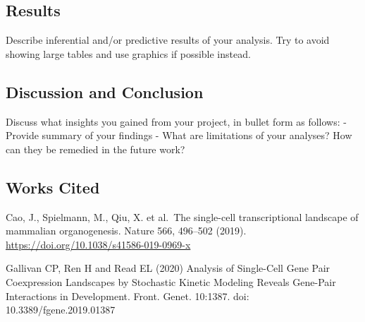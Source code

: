 \documentclass[
]{article}
\begin{document}
\hypertarget{results}{%
\subsection{Results}\label{results}}

Describe inferential and/or predictive results of your analysis. Try to
avoid showing large tables and use graphics if possible instead.

\hypertarget{discussion-and-conclusion}{%
\subsection{Discussion and Conclusion}\label{discussion-and-conclusion}}

Discuss what insights you gained from your project, in bullet form as
follows: - Provide summary of your findings - What are limitations of
your analyses? How can they be remedied in the future work?

\hypertarget{works-cited}{%
\subsection{Works Cited}\label{works-cited}}

Cao, J., Spielmann, M., Qiu, X. et al.~The single-cell transcriptional
landscape of mammalian organogenesis. Nature 566, 496--502 (2019).
\url{https://doi.org/10.1038/s41586-019-0969-x}

Gallivan CP, Ren H and Read EL (2020) Analysis of Single-Cell Gene Pair
Coexpression Landscapes by Stochastic Kinetic Modeling Reveals Gene-Pair
Interactions in Development. Front. Genet. 10:1387. doi:
10.3389/fgene.2019.01387
\end{document}
